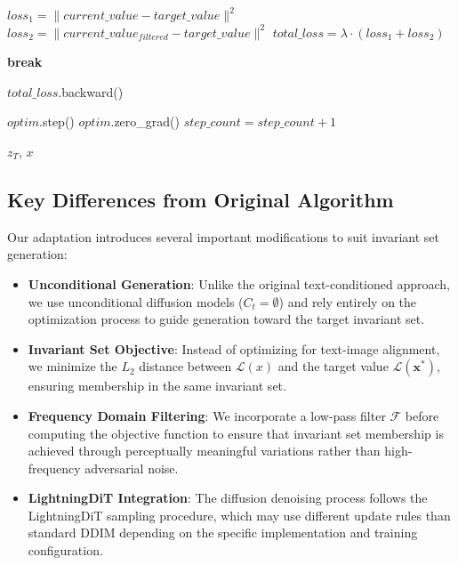 \documentclass[licencjacka,en]{pracamgr}
\begin{document}
\begin{algorithm}[H]
\begin{algorithmic}[1]
    \State $loss_1 = \|current\_value - target\_value\|^2$ 
    \State $loss_2 = \|current\_value_{filtered} - target\_value\|^2$ 
    \State $total\_loss = \lambda \cdot (loss_1 + loss_2)$ 
    
     
        \State \textbf{break} 
    \EndIf
    
    \State $total\_loss$.backward() 
    
    \State $optim$.step() 
    \State $optim$.zero\_grad() 
    \State $step\_count = step\_count + 1$ 
\EndWhile

\State \Return $z_T$, $x$ 
\end{algorithmic}
\end{algorithm}

\subsection{Key Differences from Original Algorithm}

Our adaptation introduces several important modifications to suit invariant set generation:

\begin{itemize}
    \item \textbf{Unconditional Generation}: Unlike the original text-conditioned approach, we use unconditional diffusion models ($C_t = \emptyset$) and rely entirely on the optimization process to guide generation toward the target invariant set.
    
    \item \textbf{Invariant Set Objective}: Instead of optimizing for text-image alignment, we minimize the $L_2$ distance between $\mathcal{L}(x)$ and the target value $\mathcal{L}(\mathbf{x^*})$, ensuring membership in the same invariant set.
    
    \item \textbf{Frequency Domain Filtering}: We incorporate a low-pass filter $\mathcal{F}$ before computing the objective function to ensure that invariant set membership is achieved through perceptually meaningful variations rather than high-frequency adversarial noise.
    
    \item \textbf{LightningDiT Integration}: The diffusion denoising process follows the LightningDiT sampling procedure, which may use different update rules than standard DDIM depending on the specific implementation and training configuration.
\end{itemize}
\end{document}
